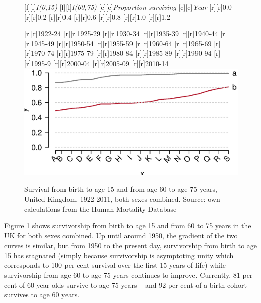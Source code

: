 \documentclass[11 pt, a4paper]{report}
\begin{document}
 
\begin{figure}[hbtp!]

[l][l]{\emph{I(0,15)}}
[l][l]{\emph{I(60,75)}}
[c][c]{\small{\emph{Proportion surviving}}}
[c][c]{\small{\emph{Year}}}
[r][r]{\small{0.0}}
[r][r]{\small{0.2}}
[r][r]{\small{0.4}}
[r][r]{\small{0.6}}
[r][r]{\small{0.8}}
[r][r]{\small{1.0}}
[r][r]{\small{1.2}}

[r][r]{\scriptsize{1922-24}}
[r][r]{\scriptsize{1925-29}}
[r][r]{\scriptsize{1930-34}}
[r][r]{\scriptsize{1935-39}}
[r][r]{\scriptsize{1940-44}}
[r][r]{\scriptsize{1945-49}}
[r][r]{\scriptsize{1950-54}}
[r][r]{\scriptsize{1955-59}}
[r][r]{\scriptsize{1960-64}}
[r][r]{\scriptsize{1965-69}}
[r][r]{\scriptsize{1970-74}}
[r][r]{\scriptsize{1975-79}}
[r][r]{\scriptsize{1980-84}}
[r][r]{\scriptsize{1985-89}}
[r][r]{\scriptsize{1990-94}}
[r][r]{\scriptsize{1995-9}}
[r][r]{\scriptsize{2000-04}}
[r][r]{\scriptsize{2005-09}}
[r][r]{\scriptsize{2010-14}}
\includegraphics[width=\textwidth]{../figures/Fig2.3.eps}

\caption{Survival from birth to age 15 and from age 60 to age 75 years, United Kingdom, 1922-2011, both sexes combined. Source: own calculations from the Human Mortality Database \citep{Lees2014}}
\label{Fig:9}
\end{figure}
Figure \ref{Fig:9} shows survivorship from birth to age 15 and from 60 to 75 years in the UK for both sexes combined. Up until around 1950, the gradient of the two curves is similar, but from 1950 to the present day, survivorship from birth to age 15 has stagnated (simply because survivorship is asymptoting unity which corresponds to 100 per cent survival over the first 15 years of life) while survivorship from age 60 to age 75 years continues to improve. Currently, 81 per cent of 60-year-olds survive to age 75 years – and 92 per cent of a birth cohort survives to age 60 years.
\end{document}
